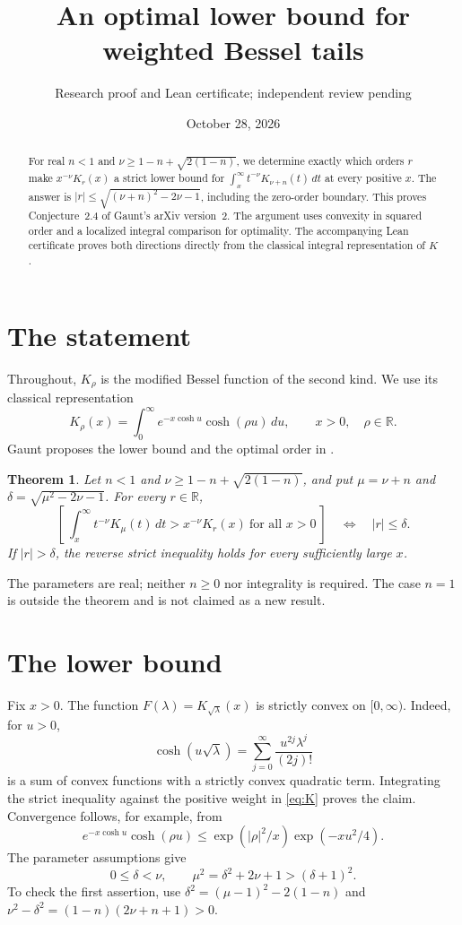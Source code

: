 \documentclass[11pt]{article}
\title{An optimal lower bound for weighted Bessel tails}
\author{Research proof and Lean certificate; independent review pending}
\date{October 28, 2026}
\newtheorem{theorem}{Theorem}
\begin{document}
\maketitle
\begin{abstract}
For real $n<1$ and $\nu\ge 1-n+\sqrt{2(1-n)}$, we determine exactly which
orders $r$ make $x^{-\nu}K_r(x)$ a strict lower bound for
$\int_x^\infty t^{-\nu}K_{\nu+n}(t)\,dt$ at every positive $x$.
The answer is $|r|\le\sqrt{(\nu+n)^2-2\nu-1}$, including the zero-order
boundary. This proves Conjecture~2.4 of Gaunt's arXiv version~2.
The argument uses convexity in squared order and a localized integral
comparison for optimality. The accompanying Lean certificate proves both
directions directly from the classical integral representation of $K$.
\end{abstract}

\section{The statement}
Throughout, $K_\rho$ is the modified Bessel function of the second kind.
We use its classical representation \cite[Eq.~10.32.9]{DLMF}
\begin{equation}\label{eq:K}
 K_\rho(x)=\int_0^\infty e^{-x\cosh u}\cosh(\rho u)\,du,
 \qquad x>0,\quad \rho\in\mathbb R.
\end{equation}
Gaunt proposes the lower bound and the optimal order in
\cite[Conjecture~2.4 and Remark~2.5]{Gaunt}.
\begin{theorem}\label{thm:main}
Let $n<1$ and $\nu\ge1-n+\sqrt{2(1-n)}$, and put
$\mu=\nu+n$ and $\delta=\sqrt{\mu^2-2\nu-1}$.
For every $r\in\mathbb R$,
\begin{equation}\label{eq:iff}
 \left[\ \int_x^\infty t^{-\nu}K_\mu(t)\,dt
       >x^{-\nu}K_r(x)\ \text{for all }x>0\ \right]
       \quad\Longleftrightarrow\quad |r|\le\delta.
\end{equation}
If $|r|>\delta$, the reverse strict inequality holds for every sufficiently
large $x$.
\end{theorem}
The parameters are real; neither $n\ge0$ nor integrality is required.
The case $n=1$ is outside the theorem and is not claimed as a new result.

\section{The lower bound}
Fix $x>0$. The function $F(\lambda)=K_{\sqrt\lambda}(x)$ is strictly convex
on $[0,\infty)$. Indeed, for $u>0$,
\[
 \cosh(u\sqrt\lambda)=\sum_{j=0}^\infty
       \frac{u^{2j}\lambda^j}{(2j)!}
\]
is a sum of convex functions with a strictly convex quadratic term.
Integrating the strict inequality against the positive weight in
\eqref{eq:K} proves the claim. Convergence follows, for example, from
\[
 e^{-x\cosh u}\cosh(\rho u)
 \le \exp(|\rho|^2/x)\exp(-xu^2/4).
\]
The parameter assumptions give
\[
 0\le\delta<\nu,\qquad
 \mu^2=\delta^2+2\nu+1>(\delta+1)^2.
\]
To check the first assertion, use
$\delta^2=(\mu-1)^2-2(1-n)$ and
$\nu^2-\delta^2=(1-n)(2\nu+n+1)>0$.
\end{document}
